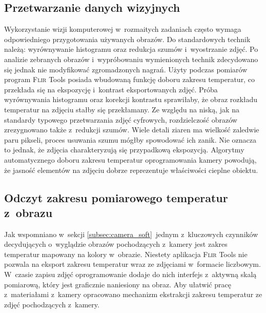 \subsection{Przetwarzanie danych wizyjnych}
Wykorzystanie wizji komputerowej w~rozmaitych zadaniach często wymaga
odpowiedniego przygotowania używanych obrazów.
Do standardowych technik należą: wyrównywanie histogramu oraz redukcja szumów
i~wyostrzanie zdjęć.
Po analizie zebranych obrazów i~wypróbowaniu wymienionych technik zdecydowano
się jednak nie modyfikować zgromadzonych nagrań.
Użyty podczas pomiarów program \textsc{Flir} Tools posiada wbudowaną funkcję
doboru zakresu temperatur, co przekłada się na ekspozycję i~kontrast
eksportowanych zdjęć.
Próba wyrównywania histogramu oraz korekcji kontrastu sprawiłaby, że obraz
rozkładu temperatur na zdjęciu stałby się przekłamany.
Ze względu na niską, jak na standardy typowego przetwarzania zdjęć cyfrowych,
rozdzielczość obrazów zrezygnowano także z~redukcji szumów.
Wiele detali ziaren ma wielkość zaledwie paru pikseli, proces usuwania szumu
mógłby spowodować ich zanik.
Nie oznacza to jednak, że zdjęcia charakteryzują się przypadkową ekspozycją.
Algorytmy automatycznego doboru zakresu temperatur oprogramowania kamery
powodują, że jasność elementów na zdjęciu dobrze reprezentuje właściwości
cieplne obiektu.

\subsection{Odczyt zakresu pomiarowego temperatur z~obrazu}
Jak wspomniano w~sekcji \ref{subsec:camera_soft}~jednym z~kluczowych czynników
decydujących o~wyglądzie obrazów pochodzących z~kamery jest zakres temperatur
mapowany na kolory w~obrazie.
Niestety aplikacja \textsc{Flir} Tools nie pozwala na eksport zakresu temperatur
wraz ze zdjęciami w~formacie liczbowym.
W~czasie zapisu zdjęć oprogramowanie dodaje do nich interfejs z~aktywną skalą
pomiarową, który jest graficznie naniesiony na obraz.
Aby ułatwić pracę z~materiałami z~kamery opracowano mechanizm ekstrakcji
zakresu temperatur ze zdjęć pochodzących z~kamery.

